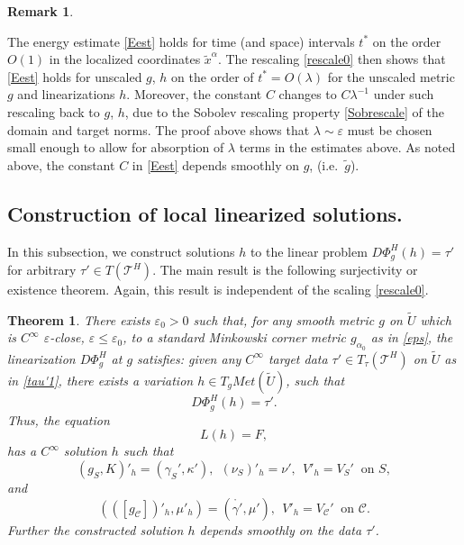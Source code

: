 \documentclass[10pt]{amsart}
\renewcommand{\a}{\alpha}
\newcommand{\g}{\gamma}
\newcommand{\e}{\varepsilon}
\renewcommand{\k}{\kappa}
\renewcommand{\l}{\lambda}
\newcommand{\cC}{{\mathcal C}}
\newcommand{\cT}{{\mathcal T}}
\newcommand{\be}{\begin{equation}}
\newcommand{\ee}{\end{equation}}
\newcommand{\<}{\langle}
\renewcommand{\>}{\rangle}
\newcommand{\w}{\widetilde}
\theoremstyle{plain}
\newtheorem{theorem}[lemma]{Theorem}
\theoremstyle{remark}
\theoremstyle{definition}
\newtheorem{remark}[lemma]{Remark}
\numberwithin{equation}{section}
\begin{document}
\begin{remark} \label{timerescale}
{\rm The energy estimate \eqref{Eest} holds for time (and space) intervals $t^*$ on the order $O(1)$ in the localized coordinates $\w x^{\a}$. The rescaling 
\eqref{rescale0} then shows that \eqref{Eest} holds for unscaled $g$, $h$ on the order of $t^* = O(\l)$ for the unscaled 
metric $g$ and linearizations $h$. Moreover, the constant $C$ changes to $C\l^{-1}$ under such rescaling back to $g$, $h$, due to the Sobolev rescaling 
property \eqref{Sobrescale} of the domain and target norms. The proof above shows that $\l \sim \e$ must be chosen small enough to allow 
for absorption of $\l$ terms in the estimates above. As noted above, the constant $C$ in \eqref{Eest} depends smoothly on $g$, (i.e.~$\w g$). 

}
\end{remark}


 \subsection{Construction of local linearized solutions.} 

In this subsection, we construct solutions $h$ to the linear problem $D\Phi_g^H(h) =  \tau'$ for arbitrary $\tau' \in T(\cT^H)$. 
The main result is the following surjectivity or existence theorem. Again, this result is independent of the scaling \eqref{rescale0}. 
  
\begin{theorem}\label{modexist}
There exists $\e_0 > 0$ such that, for any smooth metric $g$ on $\w U$ which is $C^{\infty}$ $\e$-close, $\e \leq \e_0$, to a standard Minkowski 
corner metric $g_{\a_0}$ as in \eqref{eps}, the linearization $D\Phi_g^H$ at $g$ satisfies: given any $C^{\infty}$ target data 
$\tau' \in T_{\tau}(\cT^H)$ on $\w U$ as in \eqref{tau'1}, there exists a variation $h \in T_g Met(\w U)$, such that 
\be \label{DwPhisol}
D \Phi_g^H(h) = \tau'.
\ee
Thus, the equation 
\be \label{LhF}
L(h) = F,
\ee
has a $C^{\infty}$ solution $h$ such that 
\be \label{IC1}
(g_S, K)'_h = (\g_S', \k'), \ \ (\nu_S)'_h = \nu', \ \ V'_h = V_S' \ \mbox{ on }S,
\ee
and
\be \label{BC1}
(([g_\cC])'_h, \mu'_h) = (\ring{\g'}, \mu'), \ \ V'_h = V_\cC' \ \mbox{ on }\cC.
\ee
Further the constructed solution $h$ depends smoothly on the data $\tau'$. 
\end{theorem}
  
\end{document}
